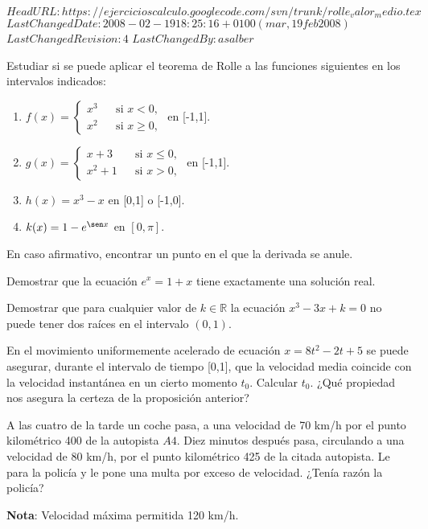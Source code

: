 \svnidlong
{$HeadURL: https://ejercicioscalculo.googlecode.com/svn/trunk/rolle_valor_medio.tex $}
{$LastChangedDate: 2008-02-19 18:25:16 +0100 (mar, 19 feb 2008) $}
{$LastChangedRevision: 4 $}
{$LastChangedBy: asalber $}
%
{Estudiar si se puede aplicar el teorema de Rolle a las funciones siguientes en los intervalos indicados:
\begin{enumerate}
    \item  $f(x)=\left\{
    \begin{array}{ccl}
        x^3 &  & \mbox{si } x<0,  \\
        x^2 &  & \mbox{si } x\geq 0,
    \end{array}\right.$
    \quad en [-1,1].

    \item  $g(x)=\left\{
    \begin{array}{ccl}
        x+3 &  & \mbox{si } x\leq 0,  \\
        x^2+1 &  & \mbox{si } x> 0,
    \end{array}\right.$
    \quad en [-1,1].

    \item  $h(x)=x^3-x$ \quad en [0,1] o [-1,0].

    \item  $k(x)=1-e^{\sen x}$ \quad  en $[0,\pi]$.
\end{enumerate}
En caso afirmativo, encontrar un punto en el que la derivada se anule.
}


{Demostrar que la ecuación $e^x=1+x$ tiene exactamente una solución real.
}


{Demostrar que para cualquier valor de $k\in \mathbb{R}$ la ecuación $x^3-3x+k=0$ no puede tener dos raíces en el intervalo $(0,1)$.
}


{En el movimiento uniformemente acelerado de ecuación $x=8t^2-2t+5$ se puede asegurar, durante el intervalo de tiempo [0,1], que la velocidad media coincide con la velocidad instantánea en un cierto momento $t_{0}$. Calcular $t_{0}$. ¿Qué propiedad nos asegura la certeza de la proposición anterior?
}


{A las cuatro de la tarde un coche pasa, a una velocidad de 70 km/h por el punto kilométrico 400 de la autopista $A4$. Diez minutos después pasa, circulando a una velocidad de 80 km/h, por el punto kilométrico 425 de la citada autopista. Le para la policía y le pone una multa por exceso de velocidad. ¿Tenía razón la policía?

\noindent  \textbf{Nota}: Velocidad máxima permitida 120 km/h.
}


